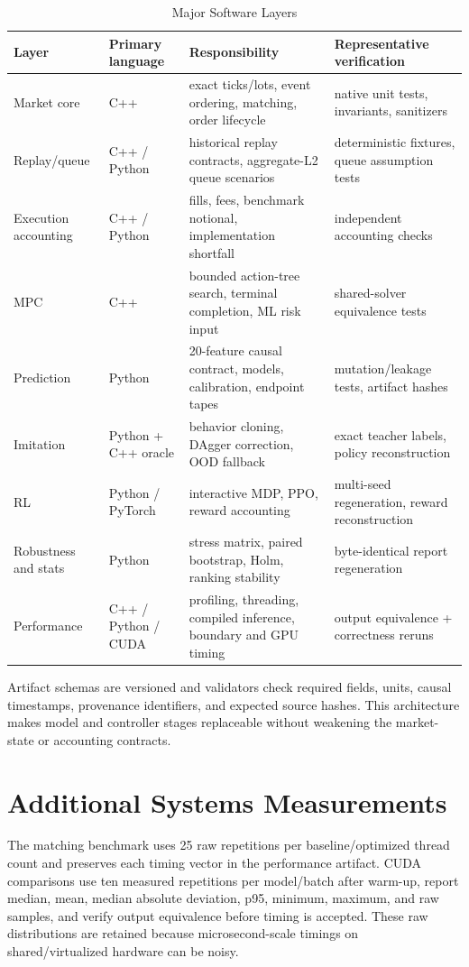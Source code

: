 \documentclass[journal,10pt]{IEEEtran}
\newcommand{\1}{\mathbf{1}}
\begin{document}
\begin{table}[t]
\centering
\caption{Major Software Layers}
\label{tab:software-layers}
\scriptsize
\setlength{\tabcolsep}{3pt}
\begin{tabular}{p{2.8cm}p{2.5cm}p{4.6cm}p{4.0cm}}
\toprule
Layer & Primary language & Responsibility & Representative verification \\
\midrule
Market core & C++ & exact ticks/lots, event ordering, matching, order lifecycle & native unit tests, invariants, sanitizers \\
Replay/queue & C++ / Python & historical replay contracts, aggregate-L2 queue scenarios & deterministic fixtures, queue assumption tests \\
Execution accounting & C++ / Python & fills, fees, benchmark notional, implementation shortfall & independent accounting checks \\
MPC & C++ & bounded action-tree search, terminal completion, ML risk input & shared-solver equivalence tests \\
Prediction & Python & 20-feature causal contract, models, calibration, endpoint tapes & mutation/leakage tests, artifact hashes \\
Imitation & Python + C++ oracle & behavior cloning, DAgger correction, OOD fallback & exact teacher labels, policy reconstruction \\
RL & Python / PyTorch & interactive MDP, PPO, reward accounting & multi-seed regeneration, reward reconstruction \\
Robustness and stats & Python & stress matrix, paired bootstrap, Holm, ranking stability & byte-identical report regeneration \\
Performance & C++ / Python / CUDA & profiling, threading, compiled inference, boundary and GPU timing & output equivalence + correctness reruns \\
\bottomrule
\end{tabular}
\end{table}

Artifact schemas are versioned and validators check required fields, units, causal timestamps, provenance identifiers, and expected source hashes. This architecture makes model and controller stages replaceable without weakening the market-state or accounting contracts.

\section{Additional Systems Measurements}
The matching benchmark uses 25 raw repetitions per baseline/optimized thread count and preserves each timing vector in the performance artifact. CUDA comparisons use ten measured repetitions per model/batch after warm-up, report median, mean, median absolute deviation, p95, minimum, maximum, and raw samples, and verify output equivalence before timing is accepted. These raw distributions are retained because microsecond-scale timings on shared/virtualized hardware can be noisy.
\end{document}

